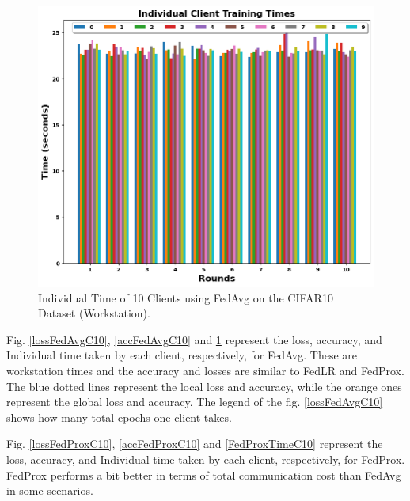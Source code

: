 \documentclass[conference]{IEEEtran}
\begin{document}
\begin{figure}[htp!]
	\centering
	\includegraphics[scale=.4]{Images/NEWGRAPHS/time_fedavg_647o56.png }
	\caption{Individual Time of 10 Clients using FedAvg on the CIFAR10 Dataset (Workstation).}
	\label{FedAvgTimeC10}
\end{figure}


Fig. \ref{lossFedAvgC10}, \ref{accFedAvgC10} and \ref{FedAvgTimeC10} represent the loss, accuracy, and Individual time taken by each client, respectively, for FedAvg.  These are workstation times and the accuracy and losses are similar to FedLR and FedProx. The blue dotted lines represent the local loss and accuracy, while the orange ones represent the global loss and accuracy. The legend of the fig. \ref{lossFedAvgC10} shows how many total epochs one client takes.

Fig. \ref{lossFedProxC10}, \ref{accFedProxC10} and \ref{FedProxTimeC10} represent the loss, accuracy, and Individual time taken by each client, respectively, for FedProx. FedProx performs a bit better in terms of total communication cost than FedAvg in some scenarios.
%
\end{document}
